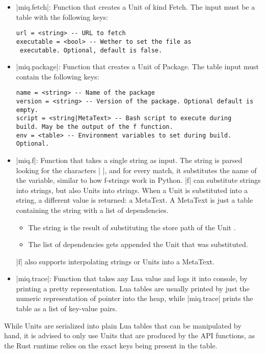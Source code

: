 \begin{itemize}
    \item |miq.fetch|: Function that creates a Unit of kind
    Fetch. The input must be a table with the following
    keys:
    \begin{verbatim}
url = <string> -- URL to fetch
executable = <bool> -- Wether to set the file as
 executable. Optional, default is false.
    \end{verbatim}

    \item |miq.package|: Function that creates a Unit of
    Package. The table input must contain the following
    keys:
    \begin{verbatim}
name = <string> -- Name of the package
version = <string> -- Version of the package. Optional default is empty.
script = <string|MetaText> -- Bash script to execute during
build. May be the output of the f function.
env = <table> -- Environment variables to set during build. Optional.
\end{verbatim}

    \item |miq.f|: Function that takes a single string as
    input. The string is parsed looking for the characters
    |{{ }}|, and for every match, it substitutes the name of
    the variable, similar to how f-strings work in Python.
    |f| can substitute strings into strings, but also Units
    into strings. When a Unit is substituted into a string,
    a different value is returned: a MetaText. A MetaText is
    just a table containing the string with a list of
    dependencies.
    \begin{itemize}
        \item The string is the result of substituting the
        store path of the Unit .
        \item The list of dependencies gets appended the
        Unit that was substituted.
    \end{itemize}
    |f| also supports interpolating strings or Units into a
    MetaText.

    \item |miq.trace|: Function that takes any Lua value and
    logs it into console, by printing a pretty
    representation. Lua tables are usually printed by just
    the numeric representation of pointer into the heap,
    while |miq.trace| prints the table as a list of
    key-value pairs.
\end{itemize}

While Units are serialized into plain Lua tables that can be
manipulated by hand, it is advised to only use Units that
are produced by the API functions, as the Rust runtime
relies on the exact keys being present in the table.

